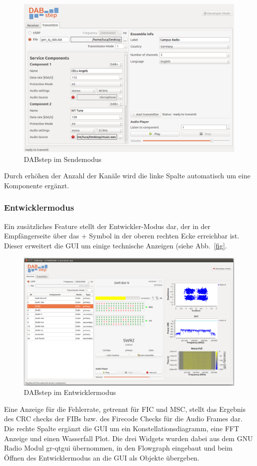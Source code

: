 \begin{figure}[h]
\centering
  \includegraphics[width=\textwidth]{figures/GUI_transmitter.png}
	\caption{DABstep im Sendemodus}
	\label{fig:GUI_transmitter}
\end{figure}

Durch erhöhen der Anzahl der Kanäle wird die linke Spalte automatisch um eine Komponente ergänzt.

\subsubsection{Entwicklermodus}
Ein zusätzliches Feature stellt der Entwickler-Modus dar, der in der Empfängerseite über das \dq + \dq Symbol in der oberen rechten Ecke erreichbar ist. Dieser erweitert die GUI um einige technische Anzeigen (siehe Abb.~\ref{fig}. 

\begin{figure}[h]
\centering
  \includegraphics[width=\textwidth]{figures/GUI_dev_mode.png}
	\caption{DABstep im Entwicklermodus}
	\label{fig:GUI_dev_mode}
\end{figure}

Eine Anzeige für die Fehlerrate, getrennt für FIC und MSC, stellt das Ergebnis des CRC checks der FIBs bzw. des Firecode Checks für die Audio Frames dar. Die rechte Spalte ergänzt die GUI um ein Konstellationsdiagramm, eine FFT Anzeige und einen Wasserfall Plot. Die drei Widgets wurden dabei aus dem GNU Radio Modul gr-qtgui übernommen, in den Flowgraph eingebaut und beim Öffnen des Entwicklermodus an die GUI als Objekte übergeben.